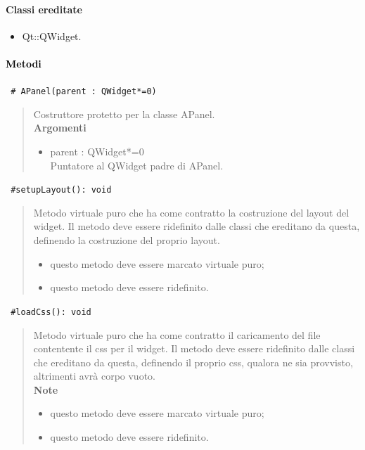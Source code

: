 \paragraph{Classi ereditate\\}
\begin{itemize}
\item Qt::QWidget.
\end{itemize}
\paragraph{\textcolor{black}{Metodi\\}}
\color{blue}\verb! # APanel(parent : QWidget*=0)!
\begin{quote}
\color{black}Costruttore protetto per la classe APanel. \\
\textbf{Argomenti}
\begin{itemize}
\item parent : QWidget*=0 \\ Puntatore al QWidget padre di APanel.
\end{itemize}
\end{quote}
\color{blue}\verb! #setupLayout(): void !
\begin{quote}
\color{black} Metodo virtuale puro che ha come contratto la costruzione del layout del widget. Il metodo deve essere ridefinito dalle classi che ereditano da questa, definendo la costruzione del proprio layout.
\begin{itemize}
\item questo metodo deve essere marcato virtuale puro;
\item questo metodo deve essere ridefinito.
\end{itemize}
\end{quote} 
\color{blue}\verb! #loadCss(): void !
\begin{quote}
\color{black} Metodo virtuale puro che ha come contratto il caricamento del file contentente il css per il widget. Il metodo deve essere ridefinito dalle classi che ereditano da questa, definendo il proprio css, qualora ne sia provvisto, altrimenti avrà corpo vuoto. \\ 
 \textbf{Note}
 \begin{itemize}
 \item questo metodo deve essere marcato virtuale puro;
 \item questo metodo deve essere ridefinito.
 \end{itemize}
\end{quote} 
